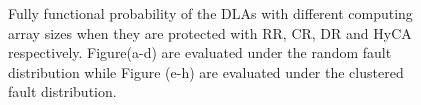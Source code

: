 \begin{figure}
\setlength{\abovecaptionskip}{-10pt}
\setlength{\belowcaptionskip}{0pt}
    \caption{Fully functional probability of the DLAs with different computing array sizes when they are protected with RR, CR, DR and HyCA respectively. Figure(a-d) are evaluated under the random fault distribution while Figure (e-h) are evaluated under the clustered fault distribution.}
\label{fig:scalability}
\vspace{-1em}
\end{figure}

